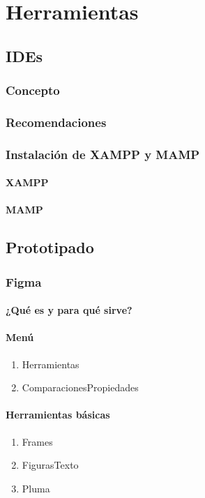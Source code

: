 \documentclass[12pt]{report}
\begin{document}
	\section{Herramientas}
		\subsection{IDEs}
			\subsubsection{Concepto}
			\subsubsection{Recomendaciones}
			\subsubsection{Instalación de XAMPP y MAMP}
				\paragraph{XAMPP}
				\paragraph{MAMP}
		\subsection{Prototipado}
			\subsubsection{Figma}
				\paragraph{¿Qué es y para qué sirve?}
				\paragraph{Menú}
					\begin{enumerate}
						\item Herramientas
						\item ComparacionesPropiedades
					\end{enumerate}
				\paragraph{Herramientas básicas}
					\begin{enumerate}
						\item Frames
						\item FigurasTexto
						\item Pluma
					\end{enumerate}
\end{document}
